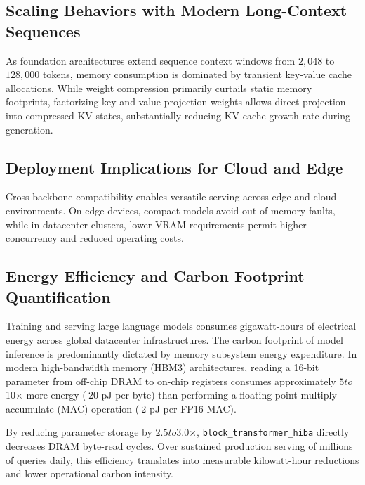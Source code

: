 \subsection{Scaling Behaviors with Modern Long-Context Sequences}
As foundation architectures extend sequence context windows from $2{,}048$ to $128{,}000$ tokens, memory consumption is dominated by transient key-value cache allocations. While weight compression primarily curtails static memory footprints, factorizing key and value projection weights allows direct projection into compressed KV states, substantially reducing KV-cache growth rate during generation.

\subsection{Deployment Implications for Cloud and Edge}
Cross-backbone compatibility enables versatile serving across edge and cloud environments. On edge devices, compact models avoid out-of-memory faults, while in datacenter clusters, lower VRAM requirements permit higher concurrency and reduced operating costs.

\subsection{Energy Efficiency and Carbon Footprint Quantification}
Training and serving large language models consumes gigawatt-hours of electrical energy across global datacenter infrastructures. The carbon footprint of model inference is predominantly dictated by memory subsystem energy expenditure. In modern high-bandwidth memory (HBM3) architectures, reading a 16-bit parameter from off-chip DRAM to on-chip registers consumes approximately $5$\times$ to $10$\times$ more energy ($~20$ pJ per byte) than performing a floating-point multiply-accumulate (MAC) operation ($~2$ pJ per FP16 MAC).

By reducing parameter storage by $2.5$\times$ to $3.0$\times$, \texttt{block\_transformer\_hiba} directly decreases DRAM byte-read cycles. Over sustained production serving of millions of queries daily, this efficiency translates into measurable kilowatt-hour reductions and lower operational carbon intensity.

